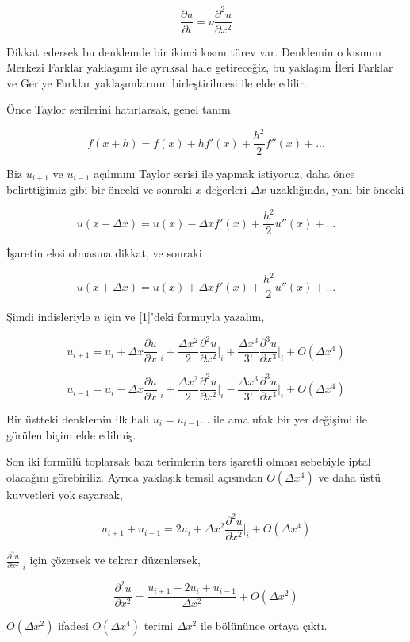 \documentclass[12pt,fleqn]{article}\usepackage{../../common}
\begin{document}
$$
\frac{\partial u}{\partial t} = \nu \frac{\partial^2 u}{\partial x^2}
$$

Dikkat edersek bu denklemde bir ikinci kısmı türev var. Denklemin o
kısmını Merkezi Farklar yaklaşımı ile ayrıksal hale getireceğiz, bu
yaklaşım İleri Farklar ve Geriye Farklar yaklaşımlarının birleştirilmesi ile
elde edilir.

Önce Taylor serilerini hatırlarsak, genel tanım

$$
f(x+h) = f(x) + h f'(x) + \frac{h^2}{2} f''(x) + ...
$$

Biz $u_{i+1}$ ve $u_{i-1}$ açılımını Taylor serisi ile yapmak istiyoruz, daha
önce belirttiğimiz gibi bir önceki ve sonraki $x$ değerleri $\Delta x$
uzaklığında, yani bir önceki

$$
u(x-\Delta x) = u(x) - \Delta x f'(x) + \frac{h^2}{2} u''(x) + ...
$$

İşaretin eksi olmasına dikkat, ve sonraki 

$$
u(x+\Delta x) = u(x) + \Delta x f'(x) + \frac{h^2}{2} u''(x) + ...
$$

Şimdi indisleriyle $u$ için ve [1]'deki formuyla yazalım,

$$
u_{i+1} = u_i + \Delta x \frac{\partial u}{\partial x}\bigg|_i +
\frac{\Delta x^2}{2} \frac{\partial ^2 u}{\partial x^2}\bigg|_i +
\frac{\Delta x^3}{3!} \frac{\partial ^3 u}{\partial x^3}\bigg|_i +
O(\Delta x^4)
$$

$$
u_{i-1} = u_i - \Delta x \frac{\partial u}{\partial x}\bigg|_i +
\frac{\Delta x^2}{2} \frac{\partial ^2 u}{\partial x^2}\bigg|_i -
\frac{\Delta x^3}{3!} \frac{\partial ^3 u}{\partial x^3}\bigg|_i +
O(\Delta x^4)
$$

Bir üstteki denklemin ilk hali $u_i = u_{i-1} ... $ ile ama ufak bir yer
değişimi ile görülen biçim elde edilmiş. 

Son iki formülü toplarsak bazı terimlerin ters işaretli olması sebebiyle iptal
olacağını görebiriliz. Ayrıca yaklaşık temsil açısından $O(\Delta x^4)$ ve daha
üstü kuvvetleri yok sayarsak, 

$$
u_{i+1} + u_{i-1} =
2u_i+\Delta x^2 \frac{\partial ^2 u}{\partial x^2}\bigg|_i +
O(\Delta x^4)
$$

$\frac{\partial ^2 u}{\partial x^2}\bigg|_i$ için çözersek ve tekrar düzenlersek,

$$
\frac{\partial ^2 u}{\partial x^2}=\frac{u_{i+1}-2u_{i}+u_{i-1}}{\Delta x^2} + O(\Delta x^2)
$$

$O(\Delta x^2)$ ifadesi $O(\Delta x^4)$ terimi $\Delta x^2$ ile bölününce ortaya çıktı.
\end{document}
